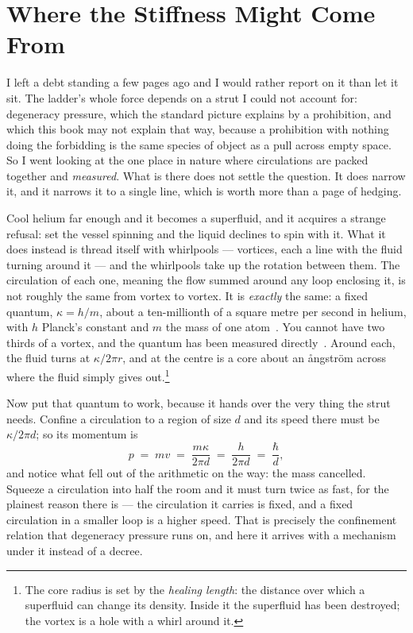 \documentclass[fontsize=11pt,paper=a4,pagesize=auto,parskip=half-]{scrbook}
\begin{document}
\section{Where the Stiffness Might Come From}

I left a debt standing a few pages ago and I would rather report on it than let it sit. The ladder's whole force depends on a strut I could not account for: degeneracy pressure, which the standard picture explains by a prohibition, and which this book may not explain that way, because a prohibition with nothing doing the forbidding is the same species of object as a pull across empty space. So I went looking at the one place in nature where circulations are packed together and \emph{measured}. What is there does not settle the question. It does narrow it, and it narrows it to a single line, which is worth more than a page of hedging.

Cool helium far enough and it becomes a superfluid, and it acquires a strange refusal: set the vessel spinning and the liquid declines to spin with it. What it does instead is thread itself with whirlpools --- vortices, each a line with the fluid turning around it --- and the whirlpools take up the rotation between them. The circulation of each one, meaning the flow summed around any loop enclosing it, is not roughly the same from vortex to vortex. It is \emph{exactly} the same: a fixed quantum, $\kappa = h/m$, about a ten-millionth of a square metre per second in helium, with $h$ Planck's constant and $m$ the mass of one atom~\cite{onsager1949,feynman1955}. You cannot have two thirds of a vortex, and the quantum has been measured directly~\cite{vinen1961}. Around each, the fluid turns at $\kappa/2\pi r$, and at the centre is a core about an \aa ngstr\"om across where the fluid simply gives out.\footnote{The core radius is set by the \emph{healing length}: the distance over which a superfluid can change its density. Inside it the superfluid has been destroyed; the vortex is a hole with a whirl around it.}

Now put that quantum to work, because it hands over the very thing the strut needs. Confine a circulation to a region of size $d$ and its speed there must be $\kappa/2\pi d$; so its momentum is
\[
p \;=\; m v \;=\; \frac{m\kappa}{2\pi d} \;=\; \frac{h}{2\pi d} \;=\; \frac{\hbar}{d},
\]
and notice what fell out of the arithmetic on the way: the mass cancelled. Squeeze a circulation into half the room and it must turn twice as fast, for the plainest reason there is --- the circulation it carries is fixed, and a fixed circulation in a smaller loop is a higher speed. That is precisely the confinement relation that degeneracy pressure runs on, and here it arrives with a mechanism under it instead of a decree.
\end{document}

